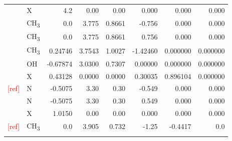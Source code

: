 \begin{table}[H]
\begin{centering}
\begin{tabular*}{1\linewidth}{@{\extracolsep{\fill}}llrrrrrr}
\addlinespace[-0.17em]
\addlinespace[-0.33em]
 & {\scriptsize{}X} & {\scriptsize{}4.2} & {\scriptsize{}0.00} & {\scriptsize{}0.00} & {\scriptsize{}0.000} & {\scriptsize{}0.000 } & {\scriptsize{}0.000 }\tabularnewline
\addlinespace[-0.17em]
\midrule 
\addlinespace[-0.33em]
{\scriptsize{}Ethane \citep{jorgensen_relative_1990}} & {\scriptsize{}CH\textsubscript{3}} & {\scriptsize{}0.0} & {\scriptsize{}3.775} & {\scriptsize{}0.8661} & {\scriptsize{}-0.756} & {\scriptsize{}0.000} & {\scriptsize{}0.000}\tabularnewline
\addlinespace[-0.17em]
\addlinespace[-0.33em]
 & {\scriptsize{}CH\textsubscript{3}} & {\scriptsize{}0.0} & {\scriptsize{}3.775} & {\scriptsize{}0.8661} & {\scriptsize{}0.756} & {\scriptsize{}0.000} & {\scriptsize{}0.000}\tabularnewline
\addlinespace[-0.17em]
\midrule 
\addlinespace[-0.33em]
{\scriptsize{}Methanol \citep{Schnabel_2007}} & {\scriptsize{}CH\textsubscript{3}} & {\scriptsize{}0.24746} & {\scriptsize{}3.7543} & {\scriptsize{}1.0027} & {\scriptsize{}-1.42460} & {\scriptsize{}0.000000} & {\scriptsize{}0.000000}\tabularnewline
\addlinespace[-0.17em]
\addlinespace[-0.33em]
 & {\scriptsize{}OH} & {\scriptsize{}-0.67874} & {\scriptsize{}3.0300} & {\scriptsize{}0.7307} & {\scriptsize{}0.00000} & {\scriptsize{}0.000000} & {\scriptsize{}0.000000}\tabularnewline
\addlinespace[-0.17em]
\addlinespace[-0.33em]
 & {\scriptsize{}X} & {\scriptsize{}0.43128} & {\scriptsize{}0.0000} & {\scriptsize{}0.0000} & {\scriptsize{}0.30035} & {\scriptsize{}0.896104} & {\scriptsize{}0.000000}\tabularnewline
\addlinespace[-0.17em]
\midrule 
\addlinespace[-0.33em]
{\scriptsize{}$\mathrm{N_{2}}$ }\textcolor{red}{\scriptsize{}{[}ref{]}} & {\scriptsize{}N} & {\scriptsize{}-0.5075} & {\scriptsize{}3.30} & {\scriptsize{}0.30} & {\scriptsize{}-0.549} & {\scriptsize{}0.000} & {\scriptsize{}0.000}\tabularnewline
\addlinespace[-0.17em]
\addlinespace[-0.33em]
 & {\scriptsize{}N} & {\scriptsize{}-0.5075} & {\scriptsize{}3.30} & {\scriptsize{}0.30} & {\scriptsize{}0.549} & {\scriptsize{}0.000} & {\scriptsize{}0.000}\tabularnewline
\addlinespace[-0.17em]
\addlinespace[-0.33em]
 & {\scriptsize{}X} & {\scriptsize{}1.0150} & {\scriptsize{}0.00} & {\scriptsize{}0.00} & {\scriptsize{}0.000} & {\scriptsize{}0.000} & {\scriptsize{}0.000}\tabularnewline
\addlinespace[-0.17em]
\midrule 
\addlinespace[-0.33em]
{\scriptsize{}Propane }\textcolor{red}{\scriptsize{}{[}ref{]}} & {\scriptsize{}CH\textsubscript{3}} & {\scriptsize{}0.0} & {\scriptsize{}3.905} & {\scriptsize{}0.732} & {\scriptsize{}-1.25} & {\scriptsize{}-0.4417} & {\scriptsize{}0.0}\tabularnewline
\addlinespace[-0.17em]
\addlinespace[-0.33em]

\end{tabular*}
\end{centering}
\end{table}
